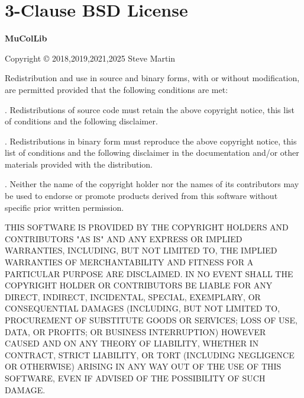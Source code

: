 \chapter*{3-Clause BSD License}
{}
\begin{center}
{\bf\large MuColLib}

Copyright \copyright{} 2018,2019,2021,2025 Steve Martin
\end{center}

Redistribution and use in source and binary forms, with or without modification, are permitted provided that the following conditions are met:

. Redistributions of source code must retain the above copyright notice, this list of conditions and the following disclaimer.

. Redistributions in binary form must reproduce the above copyright notice, this list of conditions and the following disclaimer in the documentation and/or other materials provided with the distribution.

. Neither the name of the copyright holder nor the names of its contributors may be used to endorse or promote products derived from this software without specific prior written permission.

\bigskip
\begin{flushleft}
THIS SOFTWARE IS PROVIDED BY THE COPYRIGHT HOLDERS AND CONTRIBUTORS "AS IS" AND ANY EXPRESS OR IMPLIED WARRANTIES, INCLUDING, BUT NOT LIMITED TO, THE IMPLIED WARRANTIES OF MERCHANTABILITY AND FITNESS FOR A PARTICULAR PURPOSE ARE DISCLAIMED. IN NO EVENT SHALL THE COPYRIGHT HOLDER OR CONTRIBUTORS BE LIABLE FOR ANY DIRECT, INDIRECT, INCIDENTAL, SPECIAL, EXEMPLARY, OR CONSEQUENTIAL DAMAGES (INCLUDING, BUT NOT LIMITED TO, PROCUREMENT OF SUBSTITUTE GOODS OR SERVICES; LOSS OF USE, DATA, OR PROFITS; OR BUSINESS INTERRUPTION) HOWEVER CAUSED AND ON ANY THEORY OF LIABILITY, WHETHER IN CONTRACT, STRICT LIABILITY, OR TORT (INCLUDING NEGLIGENCE OR OTHERWISE) ARISING IN ANY WAY OUT OF THE USE OF THIS SOFTWARE, EVEN IF ADVISED OF THE POSSIBILITY OF SUCH DAMAGE.
\end{flushleft}
